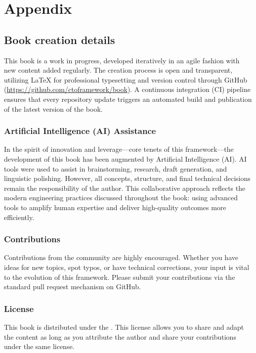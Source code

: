 \appendix

\chapter{Appendix}


\section*{Book creation details}

This book is a work in progress, developed iteratively in an agile fashion with new content added regularly. The creation process is open and transparent, utilizing \LaTeX{} for professional typesetting and version control through GitHub (\url{https://github.com/ctoframework/book}). A continuous integration (CI) pipeline ensures that every repository update triggers an automated build and publication of the latest version of the book.

\subsection*{Artificial Intelligence (AI) Assistance}

In the spirit of innovation and leverage---core tenets of this framework---the development of this book has been augmented by Artificial Intelligence (AI). AI tools were used to assist in brainstorming, research, draft generation, and linguistic polishing. However, all concepts, structure, and final technical decisions remain the responsibility of the author. This collaborative approach reflects the modern engineering practices discussed throughout the book: using advanced tools to amplify human expertise and deliver high-quality outcomes more efficiently.

\subsection*{Contributions}

Contributions from the community are highly encouraged. Whether you have ideas for new topics, spot typos, or have technical corrections, your input is vital to the evolution of this framework. Please submit your contributions via the standard pull request mechanism on GitHub.

\subsection*{License}

This book is distributed under the \booklicence. This license allows you to share and adapt the content as long as you attribute the author and share your contributions under the same license.
